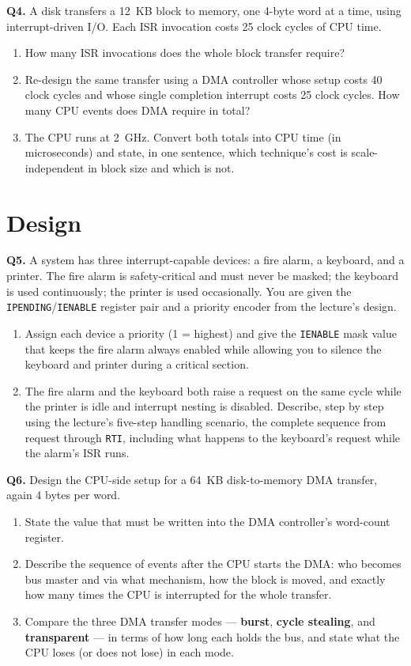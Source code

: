 \documentclass[11pt]{article}
\begin{document}
\textbf{Q4.} A disk transfers a 12~KB block to memory, one 4-byte word at a time, using interrupt-driven I/O. Each ISR invocation costs 25 clock cycles of CPU time.
\begin{enumerate}
  \item[(a)] How many ISR invocations does the whole block transfer require?
  \item[(b)] Re-design the same transfer using a DMA controller whose setup costs 40 clock cycles and whose single completion interrupt costs 25 clock cycles. How many CPU events does DMA require in total?
  \item[(c)] The CPU runs at 2~GHz. Convert both totals into CPU time (in microseconds) and state, in one sentence, which technique's cost is scale-independent in block size and which is not.
\end{enumerate}

\section{Design}

\textbf{Q5.} A system has three interrupt-capable devices: a fire alarm, a keyboard, and a printer. The fire alarm is safety-critical and must never be masked; the keyboard is used continuously; the printer is used occasionally. You are given the \texttt{IPENDING}/\texttt{IENABLE} register pair and a priority encoder from the lecture's design.
\begin{enumerate}
  \item[(a)] Assign each device a priority (1 = highest) and give the \texttt{IENABLE} mask value that keeps the fire alarm always enabled while allowing you to silence the keyboard and printer during a critical section.
  \item[(b)] The fire alarm and the keyboard both raise a request on the same cycle while the printer is idle and interrupt nesting is disabled. Describe, step by step using the lecture's five-step handling scenario, the complete sequence from request through \texttt{RTI}, including what happens to the keyboard's request while the alarm's ISR runs.
\end{enumerate}

\textbf{Q6.} Design the CPU-side setup for a 64~KB disk-to-memory DMA transfer, again 4 bytes per word.
\begin{enumerate}
  \item[(a)] State the value that must be written into the DMA controller's word-count register.
  \item[(b)] Describe the sequence of events after the CPU starts the DMA: who becomes bus master and via what mechanism, how the block is moved, and exactly how many times the CPU is interrupted for the whole transfer.
  \item[(c)] Compare the three DMA transfer modes --- \textbf{burst}, \textbf{cycle stealing}, and \textbf{transparent} --- in terms of how long each holds the bus, and state what the CPU loses (or does not lose) in each mode.
\end{enumerate}
\end{document}
